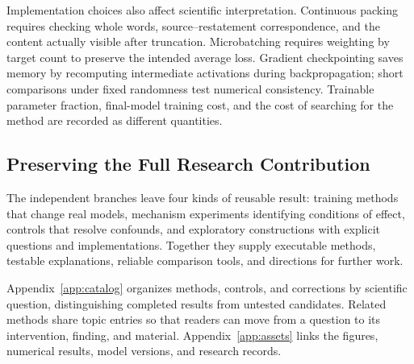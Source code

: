 Implementation choices also affect scientific interpretation. Continuous packing requires checking whole words, source--restatement correspondence, and the content actually visible after truncation. Microbatching requires weighting by target count to preserve the intended average loss. Gradient checkpointing saves memory by recomputing intermediate activations during backpropagation; short comparisons under fixed randomness test numerical consistency. Trainable parameter fraction, final-model training cost, and the cost of searching for the method are recorded as different quantities.

\subsection{Preserving the Full Research Contribution}

The independent branches leave four kinds of reusable result: training methods that change real models, mechanism experiments identifying conditions of effect, controls that resolve confounds, and exploratory constructions with explicit questions and implementations. Together they supply executable methods, testable explanations, reliable comparison tools, and directions for further work.

Appendix~\ref{app:catalog} organizes methods, controls, and corrections by scientific question, distinguishing completed results from untested candidates. Related methods share topic entries so that readers can move from a question to its intervention, finding, and material. Appendix~\ref{app:assets} links the figures, numerical results, model versions, and research records.
